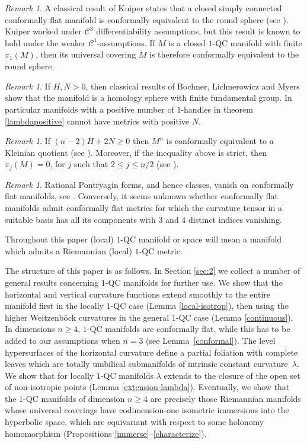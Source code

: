 \documentclass[JEP,XML,SOM,Unicode]{cedram}
\let\mathcal\mathscr
\theoremstyle{definition}
\theoremstyle{remark}
\newtheorem{remark}[theorem]{Remark}
\numberwithin{equation}{section}
\begin{document}
\begin{remark}
A classical result of Kuiper states that a closed simply connected conformally flat manifold is conformally equivalent
to the round sphere (see \cite{Ku1}). Kuiper worked under $\mathcal C^3$ differentiability assumptions, but
this result is known to hold under the weaker $\mathcal C^1$-assumptions.
If $M$ is a closed $1$-QC manifold with finite $\pi_1(M)$, then its universal covering $\widetilde{M}$
is therefore conformally equivalent to the round sphere.
\end{remark}

\begin{remark}
If $H, N >0$, then
classical results of Bochner, Lichnerowicz and Myers show
that the manifold is a homology sphere with finite
fundamental group. In particular manifolds with a positive number of $1$\nobreakdash-handles in theorem \ref{lambdapositive}
cannot have metrics with positive $N$.
\end{remark}
\begin{remark}
If $(n-2)H + 2N \geq 0$ then $M^n$ is conformally equivalent to a
Kleinian quotient (see \cite[Th.\,4.5]{SY}). Moreover, if the inequality above is strict, then
$\pi_j(M)=0$, for $j$ such that $2\leq j\leq n/2$ (see \cite[Th.\,4.6]{SY}).
\end{remark}

\begin{remark}
Rational Pontryagin forms, and hence classes,
vanish on conformally flat manifolds, see \cite{CS,Kul2}.
Conversely, it seems unknown whether conformally flat
manifolds admit conformally flat metrics for which the
curvature tensor in a suitable basis has all its components with
$3$ and $4$ distinct indices vanishing.
\end{remark}

Throughout this paper (local) $1$-QC manifold or space
will mean a manifold which admits a Riemannian
(local) $1$-QC metric.

The structure of this paper is as follows. In Section \ref{sec:2} we collect a number of general results concerning
$1$-QC manifolds for further use. We show that the horizontal and vertical curvature functions extend smoothly
to the entire manifold first in the locally $1$-QC case (Lemma \ref{local-isotrop}), then using the higher Weitzenböck curvatures in the general
$1$-QC case (Lemma \ref{continuous}). In dimensions $n\geq4$, $1$-QC manifolds are conformally flat, while this has to be added to our assumptions when $n=3$ (see Lemma~\ref{conformal}).
The level hypersurfaces of the horizontal curvature define a partial foliation with complete leaves which are
totally umbilical submanifolds of intrinsic constant curvature~$\lambda$. We show that for locally $1$-QC manifolds
$\lambda$ extends to the closure of the open set of non-isotropic points (Lemma \ref{extension-lambda}).
Eventually, we show that the $1$-QC manifolds of dimension $n\geq4$ are precisely those Riemannian
manifolds whose universal coverings have codimension-one isometric immersions into the hyperbolic space, which are
equivariant with respect to some holonomy homomorphism (Propositions \ref{immerse}--\ref{characterize}).
\end{document}
